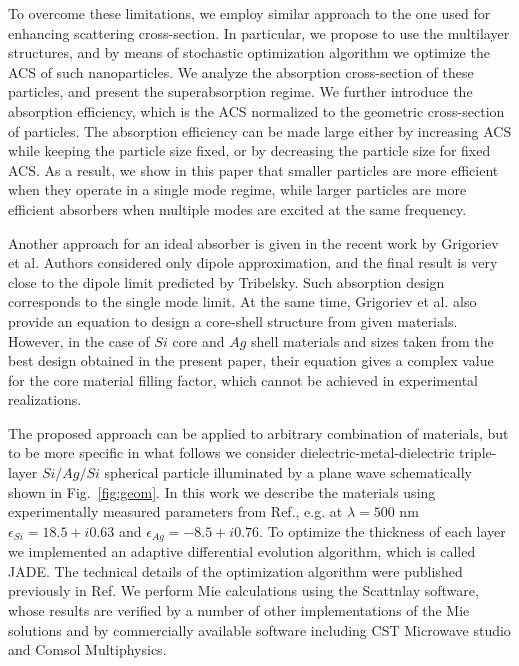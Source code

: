 \documentclass[twoside,twocolumn,9pt]{article}
\begin{document}
To overcome these limitations, we employ similar approach to the one
used for enhancing scattering cross-section.\cite{Fan-2011} In
particular, we propose to use the multilayer structures, and by means
of stochastic optimization algorithm\cite{Jingqiao-JADE-2009} we
optimize the ACS of such nanoparticles. We analyze the absorption
cross-section of these particles, and present the superabsorption
regime. We further introduce the absorption efficiency, which is the
ACS normalized to the geometric cross-section of particles. The
absorption efficiency can be made large either by increasing ACS while
keeping the particle size fixed, or by decreasing the particle size
for fixed ACS. As a result, we show in this paper that smaller
particles are more efficient when they operate in a single mode
regime, while larger particles are more efficient absorbers when
multiple modes are excited at the same frequency.

Another approach for an ideal absorber is given in the recent work by
Grigoriev et al.\cite{Grigoriev-2015} Authors considered only dipole
approximation, and the final result is very close to the dipole limit
predicted by Tribelsky.\cite{Tribelsky-2011}  Such absorption design
corresponds to the single mode limit.  At the same time, Grigoriev et
al.\cite{Grigoriev-2015} also provide an equation to design a
core-shell structure from given materials. However, in the case of
$Si$ core and $Ag$ shell materials and sizes taken from the best
design obtained in the present paper, their equation gives a complex
value for the core material filling factor, which cannot be achieved
in experimental realizations.

\begin{figure}[h]
\end{figure}

The proposed approach can be applied to arbitrary combination of
materials, but to be more specific in what follows we consider
dielectric-metal-dielectric triple-layer $Si/Ag/Si$ spherical particle
illuminated by a plane wave schematically shown in
Fig.~\ref{fig:geom}. In this work we describe the materials using
experimentally measured parameters from Ref.,\cite{palik-1997}
e.g. at $\lambda = 500$ nm $\epsilon_{Si} = 18.5 + i0.63$ and
$\epsilon_{Ag} = -8.5 + i0.76$.  To optimize the thickness of each
layer we implemented\cite{JADE-web} an adaptive differential
evolution algorithm,\cite{Storn-DE-first-1997} which is called
JADE.\cite{Jingqiao-JADE-2009}  The technical details of the
optimization algorithm were published previously in
Ref.\cite{Ladutenko-2014} We perform Mie calculations using the
Scattnlay software,\cite{Pena-scattnlay-2009,Scattnlay-web} whose
results are verified by a number of other implementations of the Mie
solutions and by commercially available software including CST
Microwave studio\cite{CST-web} and Comsol Multiphysics.\cite{Comsol-web}
\end{document}
